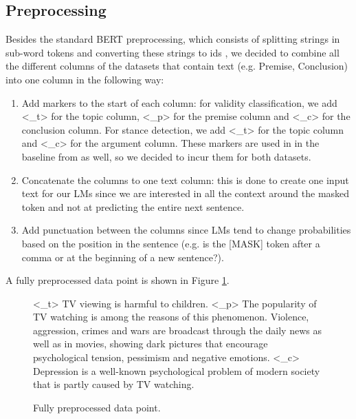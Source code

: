 \subsection{Preprocessing}

Besides the standard BERT preprocessing, which consists of splitting strings in sub-word tokens and converting these strings to ids \cite{bertprepro}, we decided to combine all the different columns of the datasets that contain text (e.g. Premise, Conclusion) into one column in the following way:
\begin{enumerate}
	\item Add markers to the start of each column: for validity classification, we add <\_t> for the topic column, <\_p> for the premise column and <\_c> for the conclusion column. For stance detection, we add <\_t> for the topic column and <\_c> for the argument column. These markers are used in in the baseline from \cite{argsvalidnovel2022} as well, so we decided to incur them for both datasets.
	\item Concatenate the columns to one text column: this is done to create one input text for our LMs since we are interested in all the context around the masked token and not at predicting the entire next sentence.
	\item Add punctuation between the columns since LMs tend to change probabilities based on the position in the sentence (e.g. is the [MASK] token after a comma or at the beginning of a new sentence?).
\end{enumerate}

A fully preprocessed data point is shown in Figure \ref{fig:exampleprep}.

\begin{figure}[H]
	\begin{displayquote}
		<\_t> TV viewing is harmful to children. <\_p> The popularity of TV watching is among the reasons of this phenomenon. 		Violence, aggression, crimes and wars are broadcast through the daily news as well as in movies, showing dark 					pictures that encourage psychological tension, pessimism and negative emotions. <\_c> Depression is a well-known 				psychological problem of modern society that is partly caused by TV watching.
	\end{displayquote}
	\caption{Fully preprocessed data point.}%
  	\label{fig:exampleprep}
\end{figure}












